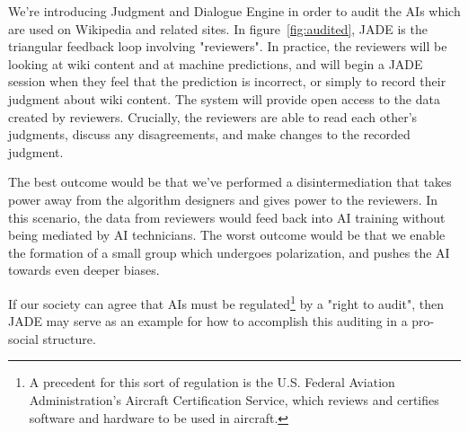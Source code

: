 \documentclass[format=sigconf, authorversion]{acmart}
\begin{document}
We're introducing Judgment and Dialogue Engine in order to audit the AIs which are used on Wikipedia and related sites.  In figure~\ref{fig:audited}, JADE is the triangular feedback loop involving "reviewers".  In practice, the reviewers will be looking at wiki content and at machine predictions, and will begin a JADE session when they feel that the prediction is incorrect, or simply to record their judgment about wiki content.  The system will provide open access to the data created by reviewers.  Crucially, the reviewers are able to read each other's judgments, discuss any disagreements, and make changes to the recorded judgment.

The best outcome would be that we've performed a disintermediation that takes power away from the algorithm designers and gives power to the reviewers.  In this scenario, the data from reviewers would feed back into AI training without being mediated by AI technicians.  The worst outcome would be that we enable the formation of a small group which undergoes polarization, and pushes the AI towards even deeper biases.

If our society can agree that AIs must be regulated\footnote{A precedent for this sort of regulation is the U.S. Federal Aviation Administration's Aircraft Certification Service, which reviews and certifies software and hardware to be used in aircraft.} by a "right to audit", then JADE may serve as an example for how to accomplish this auditing in a pro-social structure.
\end{document}
